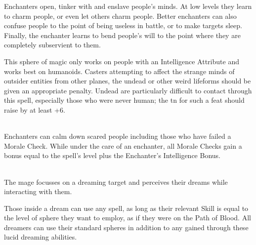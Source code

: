 \begin{multicols}{2}

\noindent
Enchanters open, tinker with and enslave people's minds. At low levels they learn to charm people, or even let others charm people. Better enchanters can also confuse people to the point of being useless in battle, or to make targets sleep. Finally, the enchanter learns to bend people's will to the point where they are completely subservient to them.

This sphere of magic only works on people with an Intelligence Attribute and works best on humanoids. Casters attempting to affect the strange minds of outsider entities from other planes, the undead or other weird lifeforms should be given an appropriate penalty. Undead are particularly difficult to contact through this spell, especially those who were never human; the \gls{tn} for such a feat should raise by at least +6.

\spelllevel

\\
Enchanters can calm down scared people including those who have failed a Morale Check.
While under the care of an enchanter, all Morale Checks gain a bonus equal to the spell's level plus the Enchanter's Intelligence Bonus.

\\
The mage focusses on a dreaming target and perceives their dreams while interacting with them.

Those inside a dream can use any spell, as long as their relevant Skill is equal to the level of sphere they want to employ, as if they were on the Path of Blood.
\iftoggle{verbose}{%
  For example, someone with Wyldcrafting 1 can use Plantform from the Aldaron sphere (which is a level 1 spell, and uses the Wyldcrafting Skill).
  Someone with Empathy 2 could use the Enchantment spells \textit{Calm}, and \textit{Focus}, but not \textit{Sleep} (as this is a level 3 spell.)

  Spells which have variable Skills, such as \textit{illusion}, are generally available.
  Someone with Wyldcrafting would be able to cast illusions of animals, and someone with Crafts would be able to make an illusion of a chest.

  Everyone's total \glspl{mp} determine their Metamagic ability, as usual.
}{}
All dreamers can use their standard spheres in addition to any gained through these lucid dreaming abilities.


\end{multicols}
